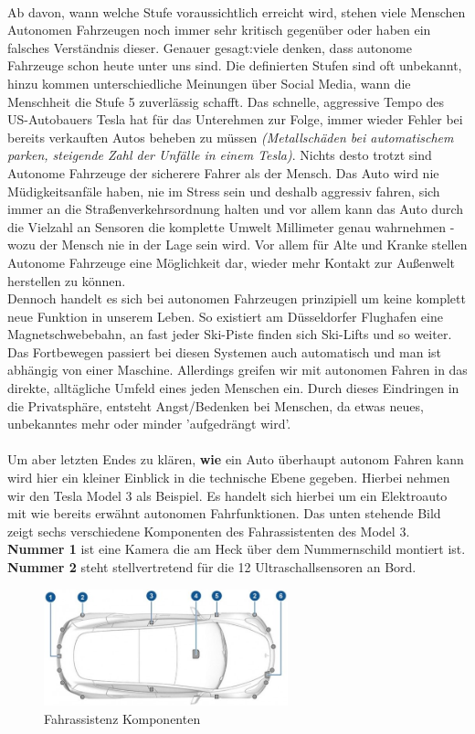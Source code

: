 \\
Ab davon, wann welche Stufe voraussichtlich erreicht wird, stehen viele Menschen Autonomen Fahrzeugen noch immer sehr kritisch gegenüber oder haben ein falsches Verständnis dieser. Genauer gesagt:viele denken, dass autonome Fahrzeuge schon heute unter uns sind.\cite{b31} Die definierten Stufen sind oft unbekannt, hinzu kommen unterschiedliche Meinungen über Social Media, wann die Menschheit die Stufe 5 zuverlässig schafft. Das schnelle, aggressive Tempo des US-Autobauers Tesla hat für das Unterehmen zur Folge, immer wieder Fehler bei bereits verkauften Autos beheben zu müssen \textit{(Metallschäden bei automatischem parken, steigende Zahl der Unfälle in einem Tesla\cite{b32})}. Nichts desto trotzt sind Autonome Fahrzeuge der sicherere Fahrer als der Mensch. Das Auto wird nie Müdigkeitsanfäle haben, nie im Stress sein und deshalb aggressiv fahren, sich immer an die Straßenverkehrsordnung halten und vor allem kann das Auto durch die Vielzahl an Sensoren die komplette Umwelt Millimeter genau wahrnehmen - wozu der Mensch nie in der Lage sein wird. Vor allem für Alte und Kranke stellen Autonome Fahrzeuge eine Möglichkeit dar, wieder mehr Kontakt zur Außenwelt herstellen zu können.\\
Dennoch handelt es sich bei autonomen Fahrzeugen  prinzipiell um keine komplett neue Funktion in unserem Leben. So existiert am Düsseldorfer Flughafen eine Magnetschwebebahn, an fast jeder Ski-Piste finden sich Ski-Lifts und so weiter. Das Fortbewegen passiert bei diesen Systemen auch automatisch und man ist abhängig von einer Maschine. Allerdings greifen wir mit autonomen Fahren in das direkte, alltägliche Umfeld eines jeden Menschen ein. Durch dieses Eindringen in die Privatsphäre, entsteht Angst/Bedenken bei Menschen, da etwas neues, unbekanntes mehr oder minder 'aufgedrängt wird'.
\\
\\
Um aber letzten Endes zu klären, \textbf{wie} ein Auto überhaupt autonom Fahren kann wird hier ein kleiner Einblick in die technische Ebene gegeben. Hierbei nehmen wir den Tesla Model 3 als Beispiel. Es handelt sich hierbei um ein Elektroauto mit wie bereits erwähnt autonomen Fahrfunktionen. Das unten stehende Bild zeigt sechs verschiedene Komponenten des Fahrassistenten des Model 3. \textbf{Nummer 1} ist eine Kamera die am Heck über dem Nummernschild montiert ist. \textbf{Nummer 2 }steht stellvertretend für die 12 Ultraschallsensoren an Bord.
\begin{figure}
  \begin{center}
    \includegraphics[width=0.63\textwidth]{pictures/tesla2.jpg}
  \end{center}
  \caption{Fahrassistenz Komponenten}
\end{figure}
